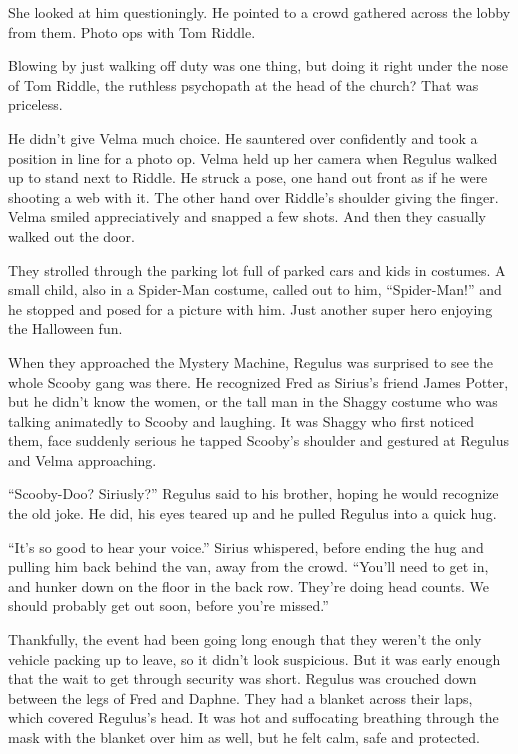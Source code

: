 \documentclass[12pt,twoside,openright]{memoir}
\begin{document}
She looked at him questioningly. He pointed to a crowd gathered across the lobby from them. Photo ops with Tom Riddle. 

Blowing by just walking off duty was one thing, but doing it right under the nose of Tom Riddle, the ruthless psychopath at the head of the church? That was priceless. 

He didn't give Velma much choice. He sauntered over confidently and took a position in line for a photo op. Velma held up her camera when Regulus walked up to stand next to Riddle. He struck a pose, one hand out front as if he were shooting a web with it. The other hand over Riddle's shoulder giving the finger. Velma smiled appreciatively and snapped a few shots. And then they casually walked out the door. 

They strolled through the parking lot full of parked cars and kids in costumes. A small child, also in a Spider-Man costume, called out to him, ``Spider-Man!'' and he stopped and posed for a picture with him. Just another super hero enjoying the Halloween fun. 

When they approached the Mystery Machine, Regulus was surprised to see the whole Scooby gang was there. He recognized Fred as Sirius's friend James Potter, but he didn't know the women, or the tall man in the Shaggy costume who was talking animatedly to Scooby and laughing. It was Shaggy who first noticed them, face suddenly serious he tapped Scooby's shoulder and gestured at Regulus and Velma approaching.

``Scooby-Doo? Siriusly?'' Regulus said to his brother, hoping he would recognize the old joke. He did, his eyes teared up and he pulled Regulus into a quick hug. 

``It's so good to hear your voice.'' Sirius whispered, before ending the hug and pulling him back behind the van, away from the crowd. ``You'll need to get in, and hunker down on the floor in the back row. They're doing head counts. We should probably get out soon, before you're missed.'' 

Thankfully, the event had been going long enough that they weren't the only vehicle packing up to leave, so it didn't look suspicious. But it was early enough that the wait to get through security was short. Regulus was crouched down between the legs of Fred and Daphne. They had a blanket across their laps, which covered Regulus's head. It was hot and suffocating breathing through the mask with the blanket over him as well, but he felt calm, safe and protected. 
\end{document}
